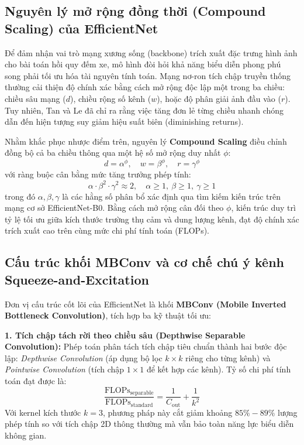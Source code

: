 \subsection{Nguyên lý mở rộng đồng thời (Compound Scaling) của EfficientNet}

Để đảm nhận vai trò mạng xương sống (backbone) trích xuất đặc trưng hình ảnh cho bài toán hồi quy đếm xe, mô hình đòi hỏi khả năng biểu diễn phong phú song phải tối ưu hóa tài nguyên tính toán. Mạng nơ-ron tích chập truyền thống thường cải thiện độ chính xác bằng cách mở rộng độc lập một trong ba chiều: chiều sâu mạng ($d$), chiều rộng số kênh ($w$), hoặc độ phân giải ảnh đầu vào ($r$). Tuy nhiên, Tan và Le \cite{efficientnet} đã chỉ ra rằng việc tăng đơn lẻ từng chiều nhanh chóng dẫn đến hiện tượng suy giảm hiệu suất biên (diminishing returns).

Nhằm khắc phục nhược điểm trên, nguyên lý \textbf{Compound Scaling} điều chỉnh đồng bộ cả ba chiều thông qua một hệ số mở rộng duy nhất $\phi$:
\begin{equation}
    d = \alpha^\phi, \quad w = \beta^\phi, \quad r = \gamma^\phi
\end{equation}
với ràng buộc cân bằng mức tăng trưởng phép tính:
\begin{equation}
    \alpha \cdot \beta^2 \cdot \gamma^2 \approx 2, \quad \alpha \ge 1, \ \beta \ge 1, \ \gamma \ge 1
\end{equation}
trong đó $\alpha, \beta, \gamma$ là các hằng số phân bổ xác định qua tìm kiếm kiến trúc trên mạng cơ sở EfficientNet-B0. Bằng cách mở rộng cân đối theo $\phi$, kiến trúc duy trì tỷ lệ tối ưu giữa kích thước trường thụ cảm và dung lượng kênh, đạt độ chính xác trích xuất cao trên cùng mức chi phí tính toán (FLOPs).

\subsection{Cấu trúc khối MBConv và cơ chế chú ý kênh Squeeze-and-Excitation}

Đơn vị cấu trúc cốt lõi của EfficientNet là khối \textbf{MBConv (Mobile Inverted Bottleneck Convolution)}, tích hợp ba kỹ thuật tối ưu:

\textbf{1. Tích chập tách rời theo chiều sâu (Depthwise Separable Convolution):}
Phép toán phân tách tích chập tiêu chuẩn thành hai bước độc lập: \textit{Depthwise Convolution} (áp dụng bộ lọc $k \times k$ riêng cho từng kênh) và \textit{Pointwise Convolution} (tích chập $1 \times 1$ để kết hợp các kênh). Tỷ số chi phí tính toán đạt được là:
\begin{equation}
    \frac{\text{FLOPs}_{\text{separable}}}{\text{FLOPs}_{\text{standard}}} = \frac{1}{C_{\text{out}}} + \frac{1}{k^2}
\end{equation}
Với kernel kích thước $k = 3$, phương pháp này cắt giảm khoảng $85\% - 89\%$ lượng phép tính so với tích chập 2D thông thường mà vẫn bảo toàn năng lực biểu diễn không gian.

